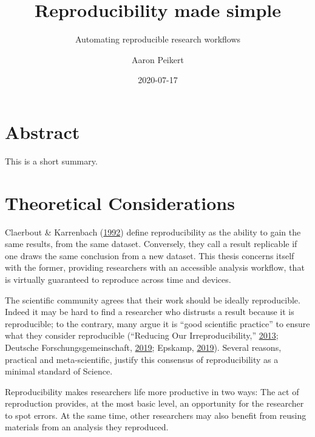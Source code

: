 \documentclass[12pt,a4paper,]{article}
\title{Reproducibility made simple}
\subtitle{Automating reproducible research workflows}
\author{Aaron Peikert}
\date{2020-07-17}
\begin{document}
\maketitle

{
\setcounter{tocdepth}{2}
\tableofcontents
}
\hypertarget{abstract}{%
\section*{Abstract}\label{abstract}}

This is a short summary.

\hypertarget{theoretical-considerations}{%
\section{Theoretical Considerations}\label{theoretical-considerations}}

Claerbout \& Karrenbach (\protect\hyperlink{ref-claerboutElectronicDocumentsGive1992}{1992}) define reproducibility as the ability to gain the same results, from the same dataset.
Conversely, they call a result replicable if one draws the same conclusion from a new dataset.
This thesis concerns itself with the former, providing researchers with an accessible analysis workflow, that is virtually guaranteed to reproduce across time and devices.

The scientific community agrees that their work should be ideally reproducible.
Indeed it may be hard to find a researcher who distrusts a result because it is reproducible; to the contrary, many argue it is ``good scientific practice'' to ensure what they consider reproducible (``Reducing Our Irreproducibility,'' \protect\hyperlink{ref-AnnouncementReducingOur2013}{2013}; Deutsche Forschungsgemeinschaft, \protect\hyperlink{ref-dfg2019}{2019}; Epskamp, \protect\hyperlink{ref-epskamp2019rep}{2019}).
Several reasons, practical and meta-scientific, justify this consensus of reproducibility as a minimal standard of Science.

Reproducibility makes researchers life more productive in two ways:
The act of reproduction provides, at the most basic level, an opportunity for the researcher to spot errors. At the same time, other researchers may also benefit from reusing materials from an analysis they reproduced.
\end{document}
